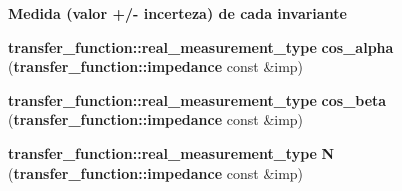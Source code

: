 \begin{Indent}{\bf Medida (valor +/- incerteza) de cada invariante}
\begin{CompactItemize}
\item 
{\bf transfer\_\-function::real\_\-measurement\_\-type} \textbf{cos\_\-alpha} ({\bf transfer\_\-function::impedance} const \&imp)\label{namespaceerro__manual_1_1base__xi__eta_1_1wal__invariant_5c6e2a59350c87e4f538f6f05d685493}

\item 
{\bf transfer\_\-function::real\_\-measurement\_\-type} \textbf{cos\_\-beta} ({\bf transfer\_\-function::impedance} const \&imp)\label{namespaceerro__manual_1_1base__xi__eta_1_1wal__invariant_1893a461a19396fadb0fcc0c7904de5c}

\item 
{\bf transfer\_\-function::real\_\-measurement\_\-type} \textbf{N} ({\bf transfer\_\-function::impedance} const \&imp)\label{namespaceerro__manual_1_1base__xi__eta_1_1wal__invariant_e74e6f334054fb99672ecc7110f9b271}

\end{CompactItemize}
\end{Indent}
